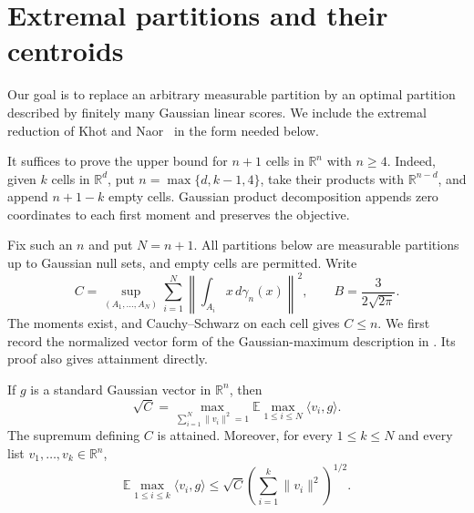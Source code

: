 \section{Extremal partitions and their centroids}
\label{ext:section}

Our goal is to replace an arbitrary measurable partition by an optimal
partition described by finitely many Gaussian linear scores. We include
the extremal reduction of Khot and
Naor~\cite[Theorem~1.2 and Lemma~3.3]{KhotNaor} in the form needed below.

It suffices to prove the upper bound for $n+1$ cells in
$\mathbb R^n$ with $n\ge4$. Indeed, given $k$ cells in
$\mathbb R^d$, put $n=\max\{d,k-1,4\}$, take their products with
$\mathbb R^{n-d}$, and append $n+1-k$ empty cells. Gaussian product
decomposition appends zero coordinates to each first moment and
preserves the objective.

Fix such an $n$ and put $N=n+1$. All partitions below are measurable
partitions up to Gaussian null sets, and empty cells are permitted. Write
\[
 C=\sup_{(A_1,\ldots,A_N)}
       \sum_{i=1}^N\left\|\int_{A_i}x\,d\gamma_n(x)\right\|^2,
 \qquad B=\frac{3}{2\sqrt{2\pi}}.
\]
The moments exist, and Cauchy--Schwarz on each cell gives $C\le n$.
We first record the normalized vector form of the Gaussian-maximum
description in \cite[Lemma~3.7]{KhotNaor}. Its proof also gives
attainment directly.

\begin{lemma}\label{ext:duality}
If $g$ is a standard Gaussian vector in $\mathbb R^n$, then
\begin{equation}\label{ext:dual-formula}
 \sqrt C=
 \max_{\sum_{i=1}^N\|v_i\|^2=1}
       \mathbb E\max_{1\le i\le N}\langle v_i,g\rangle.
\end{equation}
The supremum defining $C$ is attained. Moreover, for every $1\le k\le N$
and every list $v_1,\ldots,v_k\in\mathbb R^n$,
\begin{equation}\label{ext:shorter-list}
 \mathbb E\max_{1\le i\le k}\langle v_i,g\rangle
 \le \sqrt C\left(\sum_{i=1}^k\|v_i\|^2\right)^{1/2}.
\end{equation}
\end{lemma}

